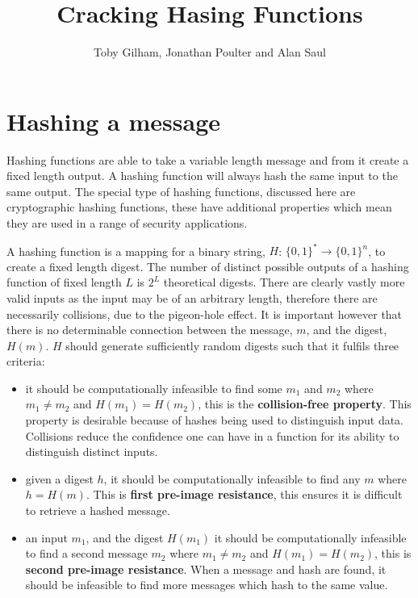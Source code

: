 \documentclass[a4paper,12pt]{article}
\title{Cracking Hasing Functions}
\author{Toby Gilham, Jonathan Poulter and Alan Saul}
\date{}
\begin{document}
\maketitle



\section{Hashing a message}
Hashing functions are able to take a variable length message and from it create a fixed length output. A hashing function will always hash the same input to the same output. The special type of hashing functions, discussed here are cryptographic hashing functions, these have additional properties which mean they are used in a range of security applications.

A hashing function is a mapping for a binary string, $H$: $\{0,1\}^* \rightarrow \{0,1\}^n$, to create a fixed length digest. The number of distinct possible outputs of a hashing function of fixed length $L$ is $2^L$ theoretical digests. There are clearly vastly more valid inputs as the input may be of an arbitrary length, therefore there are necessarily collisions, due to the pigeon-hole effect. It is important however that there is no determinable connection between the message, $m$, and the digest, $H(m)$. $H$ should generate sufficiently random digests such that it fulfils three criteria:
\begin{itemize}
  \item it should be computationally infeasible to find some $m_1$ and $m_2$ where $m_1 \neq m_2$ and $H(m_1) = H(m_2)$, this is the \textbf{collision-free property}. This property is desirable because of hashes being used to distinguish input data. Collisions reduce the confidence one can have in a function for its ability to distinguish distinct inputs.
  \item given a digest $h$, it should be computationally infeasible to find any $m$ where $h = H(m)$. This is \textbf{first pre-image resistance}, this ensures it is difficult to retrieve a hashed message.
  \item  an input $m_1$, and the digest $H(m_1)$ it should be computationally infeasible to find a second message $m_2$ where $m_1 \neq m_2$ and $H(m_1) = H(m_2)$, this is \textbf{second pre-image resistance}. When a message and hash are found, it should be infeasible to find more messages which hash to the same value.
\end{itemize}
\end{document}
